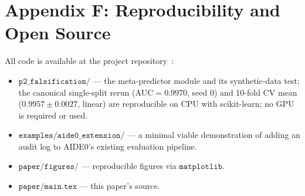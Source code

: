 \documentclass{article}
\theoremstyle{definition}
\begin{document}
\section*{Appendix F: Reproducibility and Open Source}

All code is available at the project repository~\cite{anon2026bi}:
\begin{itemize}
    \item $\mathtt{p2\_falsification/}$ --- the meta-predictor module and its synthetic-data test; the canonical single-split rerun ($\text{AUC}=0.9970$, seed 0) and 10-fold CV mean ($0.9957\pm0.0027$, linear) are reproducible on CPU with scikit-learn; no GPU is required or used.
    \item $\mathtt{examples/aide0\_extension/}$ --- a minimal viable demonstration of adding an audit log to AIDE0's existing evaluation pipeline.
    \item $\mathtt{paper/figures/}$ --- reproducible figures via $\mathtt{matplotlib}$.
    \item $\mathtt{paper/main.tex}$ --- this paper's source.
\end{itemize}

\nocite{*}



\end{document}
